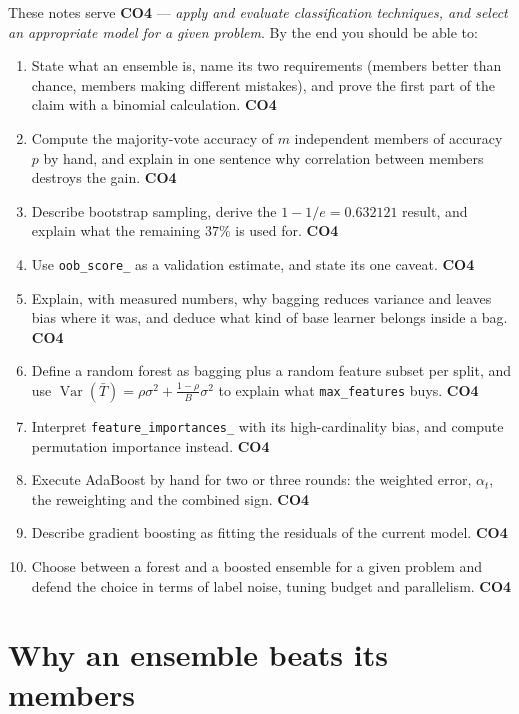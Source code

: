 \documentclass[11pt]{article}
\begin{document}
These notes serve \textbf{CO4} --- \emph{apply and evaluate classification
techniques, and select an appropriate model for a given problem}. By the end
you should be able to:

\begin{enumerate}[leftmargin=*]
  \item State what an ensemble is, name its two requirements (members better
    than chance, members making different mistakes), and prove the first part
    of the claim with a binomial calculation. \hfill \textbf{CO4}
  \item Compute the majority-vote accuracy of $m$ independent members of
    accuracy $p$ by hand, and explain in one sentence why correlation between
    members destroys the gain. \hfill \textbf{CO4}
  \item Describe bootstrap sampling, derive the $1 - 1/e = 0.632121$ result,
    and explain what the remaining $37\%$ is used for. \hfill \textbf{CO4}
  \item Use \texttt{oob\_score\_} as a validation estimate, and state its one
    caveat. \hfill \textbf{CO4}
  \item Explain, with measured numbers, why bagging reduces variance and
    leaves bias where it was, and deduce what kind of base learner belongs
    inside a bag. \hfill \textbf{CO4}
  \item Define a random forest as bagging plus a random feature subset per
    split, and use
    $\operatorname{Var}(\bar T) = \rho\sigma^2 + \frac{1-\rho}{B}\sigma^2$ to
    explain what \texttt{max\_features} buys. \hfill \textbf{CO4}
  \item Interpret \texttt{feature\_importances\_} with its high-cardinality
    bias, and compute permutation importance instead. \hfill \textbf{CO4}
  \item Execute AdaBoost by hand for two or three rounds: the weighted error,
    $\alpha_t$, the reweighting and the combined sign. \hfill \textbf{CO4}
  \item Describe gradient boosting as fitting the residuals of the current
    model. \hfill \textbf{CO4}
  \item Choose between a forest and a boosted ensemble for a given problem and
    defend the choice in terms of label noise, tuning budget and
    parallelism. \hfill \textbf{CO4}
\end{enumerate}

\section{Why an ensemble beats its members}
\label{sec:jury}
\end{document}
